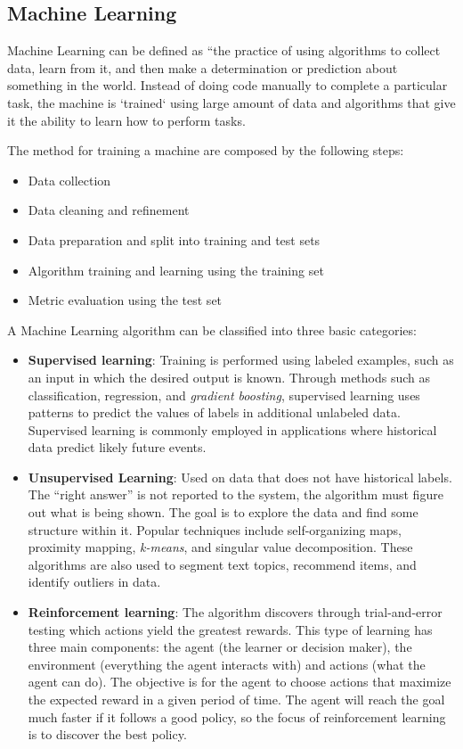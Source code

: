 \documentclass[sigconf]{acmart}
\begin{document}
\subsection{Machine Learning}
Machine Learning can be defined as “the practice of using algorithms to collect data, learn from it, and then make a determination or prediction about something in the world. Instead of doing code manually to complete a particular task, the machine is `trained` using large amount of data and algorithms that give it the ability to learn how to perform tasks.

The method for training a machine are composed by the following steps:

\begin{itemize}
\item Data collection
\item Data cleaning and refinement
\item Data preparation and split into training and test sets
\item Algorithm training and learning using the training set
\item Metric evaluation using the test set
\end{itemize}

A Machine Learning algorithm can be classified into three basic categories:

\begin{itemize}
\item \textbf{Supervised learning}: Training is performed using labeled examples, such as an input in which the desired output is known. Through methods such as classification, regression, and \textit{gradient boosting}, supervised learning uses patterns to predict the values of labels in additional unlabeled data. Supervised learning is commonly employed in applications where historical data predict likely future events.
\item \textbf{Unsupervised Learning}: Used on data that does not have historical labels. The “right answer” is not reported to the system, the algorithm must figure out what is being shown. The goal is to explore the data and find some structure within it. Popular techniques include self-organizing maps, proximity mapping, \textit{k-means}, and singular value decomposition. These algorithms are also used to segment text topics, recommend items, and identify outliers in data.
\item \textbf{Reinforcement learning}: The algorithm discovers through trial-and-error testing which actions yield the greatest rewards. This type of learning has three main components: the agent (the learner or decision maker), the environment (everything the agent interacts with) and actions (what the agent can do). The objective is for the agent to choose actions that maximize the expected reward in a given period of time. The agent will reach the goal much faster if it follows a good policy, so the focus of reinforcement learning is to discover the best policy.
\end{itemize}
\end{document}
